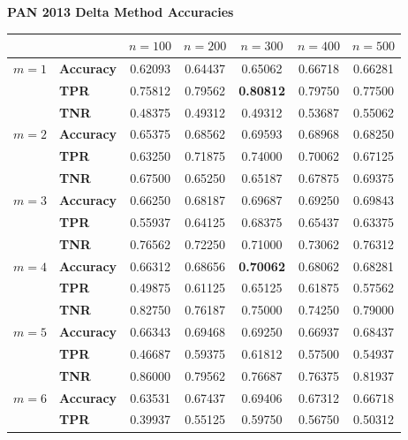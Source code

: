 \begin{table}
    \centering
    \textbf{PAN 2013 Delta Method Accuracies}\par\medskip
    \begin{tabular}{c|lccccc}
               &                   & $n=100$ & $n=200$ & $n=300$ & $n=400$ & $n=500$ \\
        \hline
        $m=1$  & \textbf{Accuracy} & 0.62093 & 0.64437 & 0.65062 & 0.66718 & 0.66281 \\
               & \textbf{TPR}      & 0.75812 & 0.79562 & \textbf{0.80812} & 0.79750 & 0.77500 \\
               & \textbf{TNR}      & 0.48375 & 0.49312 & 0.49312 & 0.53687 & 0.55062 \\
        \hline
        $m=2$  & \textbf{Accuracy} & 0.65375 & 0.68562 & 0.69593 & 0.68968 & 0.68250 \\
               & \textbf{TPR}      & 0.63250 & 0.71875 & 0.74000 & 0.70062 & 0.67125 \\
               & \textbf{TNR}      & 0.67500 & 0.65250 & 0.65187 & 0.67875 & 0.69375 \\
        \hline
        $m=3$  & \textbf{Accuracy} & 0.66250 & 0.68187 & 0.69687 & 0.69250 & 0.69843 \\
               & \textbf{TPR}      & 0.55937 & 0.64125 & 0.68375 & 0.65437 & 0.63375 \\
               & \textbf{TNR}      & 0.76562 & 0.72250 & 0.71000 & 0.73062 & 0.76312 \\
        \hline
        $m=4$  & \textbf{Accuracy} & 0.66312 & 0.68656 & \textbf{0.70062} & 0.68062 & 0.68281 \\
               & \textbf{TPR}      & 0.49875 & 0.61125 & 0.65125 & 0.61875 & 0.57562 \\
               & \textbf{TNR}      & 0.82750 & 0.76187 & 0.75000 & 0.74250 & 0.79000 \\
        \hline
        $m=5$  & \textbf{Accuracy} & 0.66343 & 0.69468 & 0.69250 & 0.66937 & 0.68437 \\
               & \textbf{TPR}      & 0.46687 & 0.59375 & 0.61812 & 0.57500 & 0.54937 \\
               & \textbf{TNR}      & 0.86000 & 0.79562 & 0.76687 & 0.76375 & 0.81937 \\
        \hline
        $m=6$  & \textbf{Accuracy} & 0.63531 & 0.67437 & 0.69406 & 0.67312 & 0.66718 \\
               & \textbf{TPR}      & 0.39937 & 0.55125 & 0.59750 & 0.56750 & 0.50312 \\

\end{tabular}
\end{table}
